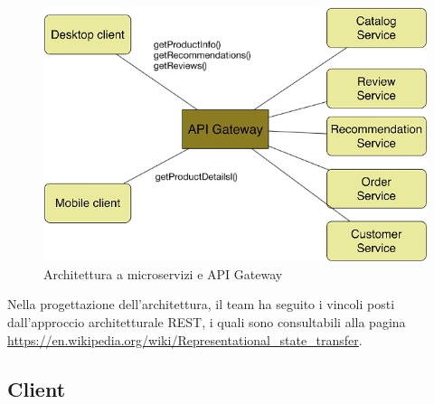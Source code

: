 \begin{figure}[h]
	\centering
	\includegraphics[width=\textwidth,height=\textheight,keepaspectratio,scale=0.1]{images/apigateway1.png}
	\caption{Architettura a microservizi e API Gateway}\label{fig:apig1}
\end{figure}
\newpage
Nella progettazione dell'architettura, il team ha seguito i vincoli posti dall'approccio architetturale REST, i quali sono consultabili alla pagina \url{https://en.wikipedia.org/wiki/Representational_state_transfer}.
\subsection{Client}
